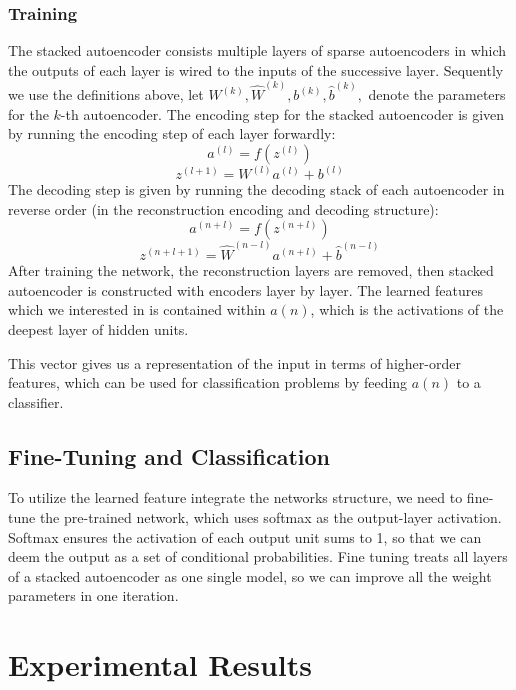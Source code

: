 \documentclass[journal]{IEEEtran}
\begin{document}
\subsubsection{Training}
The stacked autoencoder consists multiple layers of sparse autoencoders in which the outputs of each layer is wired to the inputs of the successive layer. Sequently we use the definitions above, let $W^{(k)}, \hat{W}^{(k)}, b^{(k)}, \hat{b}^{(k)},$ denote the parameters for the $k$-th autoencoder. The encoding step for the stacked autoencoder is given by running the encoding step of each layer forwardly:
\begin{equation}
a^{(l)} = f(z^{(l)})
\end{equation}
\begin{equation}
z^{(l+1)} = W^{(l)}a^{(l)} + b^{(l)}
\end{equation}
The decoding step is given by running the decoding stack of each autoencoder in reverse order (in the reconstruction encoding and decoding structure):
\begin{equation}
a^{(n + l)} = f(z^{(n + l)}) 
\end{equation}
\begin{equation}
z^{(n + l + 1)} = \hat{W}^{(n - l)}a^{(n + l)} + \hat{b}^{(n - l)}
\end{equation}
After training the network, the reconstruction layers are removed, then stacked autoencoder is constructed with encoders layer by layer. The learned features which we interested in is contained within $a(n)$, which is the activations of the deepest layer of hidden units. 


This vector gives us a representation of the input in terms of higher-order features, which can be used for classification problems by feeding $a(n)$ to a classifier.

\subsection{Fine-Tuning and Classification}
To utilize the learned feature integrate the networks structure, we need to fine-tune the pre-trained network, which uses softmax as the output-layer activation. Softmax ensures the activation of each output unit sums to 1, so that we can deem the output as a set of conditional probabilities. Fine tuning treats all layers of a stacked autoencoder as one single model, so we can improve all the weight parameters in one iteration.



\section{Experimental Results}
\end{document}
